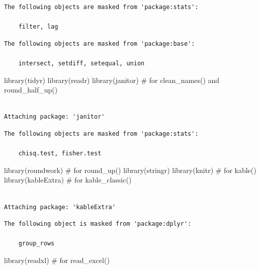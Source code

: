 \documentclass[
  letterpaper,
  DIV=11,
  numbers=noendperiod]{scrreprt}
\newenvironment{Shaded}{\begin{snugshade}}{\end{snugshade}}
\newcommand{\CommentTok}[1]{\textcolor[rgb]{0.37,0.37,0.37}{#1}}
\newcommand{\FunctionTok}[1]{\textcolor[rgb]{0.28,0.35,0.67}{#1}}
\newcommand{\NormalTok}[1]{\textcolor[rgb]{0.00,0.23,0.31}{#1}}
\begin{document}
\begin{verbatim}
The following objects are masked from 'package:stats':

    filter, lag
\end{verbatim}

\begin{verbatim}
The following objects are masked from 'package:base':

    intersect, setdiff, setequal, union
\end{verbatim}

\begin{Shaded}
\begin{Highlighting}[]
\FunctionTok{library}\NormalTok{(tidyr)}
\FunctionTok{library}\NormalTok{(readr)}
\FunctionTok{library}\NormalTok{(janitor) }\CommentTok{\# for clean\_names() and round\_half\_up()}
\end{Highlighting}
\end{Shaded}

\begin{verbatim}

Attaching package: 'janitor'
\end{verbatim}

\begin{verbatim}
The following objects are masked from 'package:stats':

    chisq.test, fisher.test
\end{verbatim}

\begin{Shaded}
\begin{Highlighting}[]
\FunctionTok{library}\NormalTok{(roundwork) }\CommentTok{\# for round\_up()}
\FunctionTok{library}\NormalTok{(stringr)}
\FunctionTok{library}\NormalTok{(knitr) }\CommentTok{\# for kable()}
\FunctionTok{library}\NormalTok{(kableExtra) }\CommentTok{\# for kable\_classic()}
\end{Highlighting}
\end{Shaded}

\begin{verbatim}

Attaching package: 'kableExtra'
\end{verbatim}

\begin{verbatim}
The following object is masked from 'package:dplyr':

    group_rows
\end{verbatim}

\begin{Shaded}
\begin{Highlighting}[]
\FunctionTok{library}\NormalTok{(readxl) }\CommentTok{\# for read\_excel()}
\end{Highlighting}
\end{Shaded}
\end{document}
